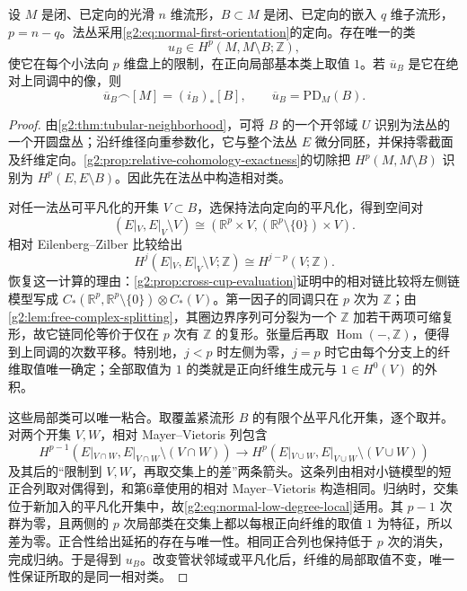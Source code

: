 \begin{lemma}\label{g2:lem:normal-relative-class}
	设 \(M\) 是闭、已定向的光滑 \(n\) 维流形，\(B\subset M\) 是闭、已定向的嵌入 \(q\) 维子流形，\(p=n-q\)。法丛采用\eqref{g2:eq:normal-first-orientation}的定向。存在唯一的类
	\[
		u_B\in H^p(M,M\setminus B;\mathbb Z),
	\]
	使它在每个小法向 \(p\) 维盘上的限制，在正向局部基本类上取值 \(1\)。若 \(\overline u_B\) 是它在绝对上同调中的像，则
	\begin{equation}\label{g2:eq:normal-class-cap-fundamental}
		\overline u_B\frown[M]=(i_B)_*[B],\qquad
		\overline u_B=\mathrm{PD}_M(B).
	\end{equation}
\end{lemma}
\begin{proof}
	由\cref{g2:thm:tubular-neighborhood}，可将 \(B\) 的一个开邻域 \(U\) 识别为法丛的一个开圆盘丛；沿纤维径向重参数化，它与整个法丛 \(E\) 微分同胚，并保持零截面及纤维定向。\cref{g2:prop:relative-cohomology-exactness}的切除把 \(H^p(M,M\setminus B)\) 识别为 \(H^p(E,E\setminus B)\)。因此先在法丛中构造相对类。

	对任一法丛可平凡化的开集 \(V\subset B\)，选保持法向定向的平凡化，得到空间对
	\[
		(E|_V,E|_V\setminus V)\cong
		(\mathbb R^p\times V,(\mathbb R^p\setminus\{0\})\times V).
	\]
	相对 Eilenberg--Zilber 比较给出
	\begin{equation}\label{g2:eq:normal-low-degree-local}
		H^j(E|_V,E|_V\setminus V;\mathbb Z)\cong H^{j-p}(V;\mathbb Z).
	\end{equation}
	恢复这一计算的理由：\cref{g2:prop:cross-cup-evaluation}证明中的相对链比较将左侧链模型写成 \(C_*(\mathbb R^p,\mathbb R^p\setminus\{0\})\otimes C_*(V)\)。第一因子的同调只在 \(p\) 次为 \(\mathbb Z\)；由\cref{g2:lem:free-complex-splitting}，其圈边界序列可分裂为一个 \(\mathbb Z\) 加若干两项可缩复形，故它链同伦等价于仅在 \(p\) 次有 \(\mathbb Z\) 的复形。张量后再取 \(\operatorname{Hom}(-,\mathbb Z)\)，便得到上同调的次数平移。特别地，\(j<p\) 时左侧为零，\(j=p\) 时它由每个分支上的纤维取值唯一确定；全部取值为 \(1\) 的类就是正向纤维生成元与 \(1\in H^0(V)\) 的外积。

	这些局部类可以唯一粘合。取覆盖紧流形 \(B\) 的有限个丛平凡化开集，逐个取并。对两个开集 \(V,W\)，相对 Mayer--Vietoris 列包含
	\[
		H^{p-1}(E|_{V\cap W},E|_{V\cap W}\setminus(V\cap W))
		\longrightarrow H^p(E|_{V\cup W},E|_{V\cup W}\setminus(V\cup W))
	\]
	及其后的“限制到 \(V,W\)，再取交集上的差”两条箭头。这条列由相对小链模型的短正合列取对偶得到，和第6章使用的相对 Mayer--Vietoris 构造相同。归纳时，交集位于新加入的平凡化开集中，故\eqref{g2:eq:normal-low-degree-local}适用。其 \(p-1\) 次群为零，且两侧的 \(p\) 次局部类在交集上都以每根正向纤维的取值 \(1\) 为特征，所以差为零。正合性给出延拓的存在与唯一性。相同正合列也保持低于 \(p\) 次的消失，完成归纳。于是得到 \(u_B\)。改变管状邻域或平凡化后，纤维的局部取值不变，唯一性保证所取的是同一相对类。


\end{proof}
